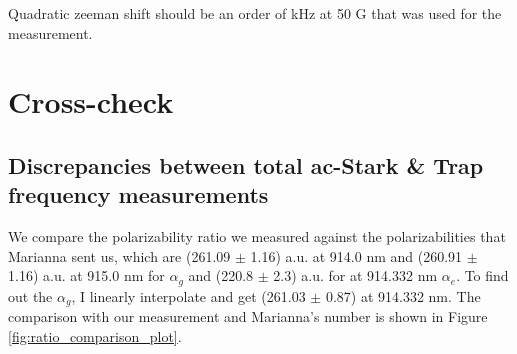 \documentclass[bibnotes]{article}
\begin{document}
			\noindent Quadratic zeeman shift should be an order of kHz at 50 G that was used for the measurement. 
















\section{Cross-check}
	\subsection{Discrepancies between total ac-Stark \& Trap frequency measurements}

		We compare the polarizability ratio we measured against the polarizabilities that Marianna sent us, which are (261.09 $\pm$ 1.16) a.u. at 914.0 nm and (260.91 $\pm$ 1.16) a.u. at 915.0 nm for $\alpha_g$ and (220.8 $\pm$ 2.3) a.u. for at 914.332 nm $\alpha_e$. To find out the $\alpha_g$, I linearly interpolate and get (261.03 $\pm$ 0.87) at 914.332 nm. The comparison with our measurement and Marianna's number is shown in Figure \ref{fig:ratio_comparison_plot}.
\end{document}
